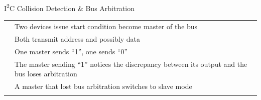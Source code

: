 \documentclass[]{beamer} %
\newcommand{\greenbullet}{\textcolor{bettergreen}\textbullet}
\newcommand{\twi}{I\textsuperscript{2}C\xspace}
\begin{document}
\begin{frame}[fragile]{\twi Collision Detection \& Bus Arbitration}
	\begin{minipage}[c][.4\textheight][c]{\linewidth}
		\begin{tabular}{p{0.15cm} l}
			\greenbullet & Two devices issue start condition \textrightarrow become master of the bus\\
			\greenbullet & Both transmit address and possibly data\\
			\greenbullet & One master sends ``1'', one sends ``0''\\
			\greenbullet & The master sending ``1'' notices the discrepancy between its output and the bus \textrightarrow loses arbitration\\
			\greenbullet & A master that lost bus arbitration switches to slave mode\\
			\\
		\end{tabular}

\end{minipage}
\end{frame}
\end{document}
